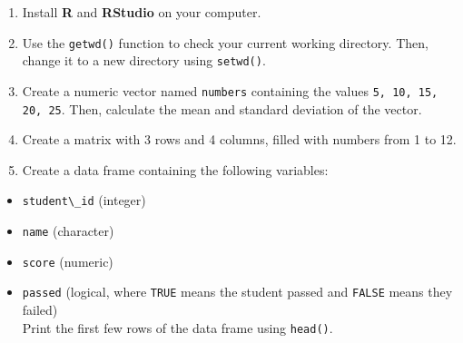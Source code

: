 \documentclass[
  11pt,
]{book}
\newcommand{\passthrough}[1]{#1}
\providecommand{\tightlist}{%
  \setlength{\itemsep}{0pt}\setlength{\parskip}{0pt}}
\theoremstyle{definition}
\theoremstyle{definition}
\theoremstyle{definition}
\theoremstyle{definition}
\theoremstyle{remark}
\begin{document}
\begin{enumerate}
\def\labelenumi{\arabic{enumi}.}
\tightlist
\item
  Install \textbf{R} and \textbf{RStudio} on your computer.\\
\item
  Use the \passthrough{\lstinline!getwd()!} function to check your current working directory. Then, change it to a new directory using \passthrough{\lstinline!setwd()!}.\\
\item
  Create a numeric vector named \passthrough{\lstinline!numbers!} containing the values \passthrough{\lstinline!5, 10, 15, 20, 25!}. Then, calculate the mean and standard deviation of the vector.\\
\item
  Create a matrix with 3 rows and 4 columns, filled with numbers from 1 to 12.\\
\item
  Create a data frame containing the following variables:\\
\end{enumerate}

\begin{itemize}
\tightlist
\item
  \passthrough{\lstinline!student\_id!} (integer)\\
\item
  \passthrough{\lstinline!name!} (character)\\
\item
  \passthrough{\lstinline!score!} (numeric)\\
\item
  \passthrough{\lstinline!passed!} (logical, where \passthrough{\lstinline!TRUE!} means the student passed and \passthrough{\lstinline!FALSE!} means they failed)\\
  Print the first few rows of the data frame using \passthrough{\lstinline!head()!}.\\
\end{itemize}
\end{document}
